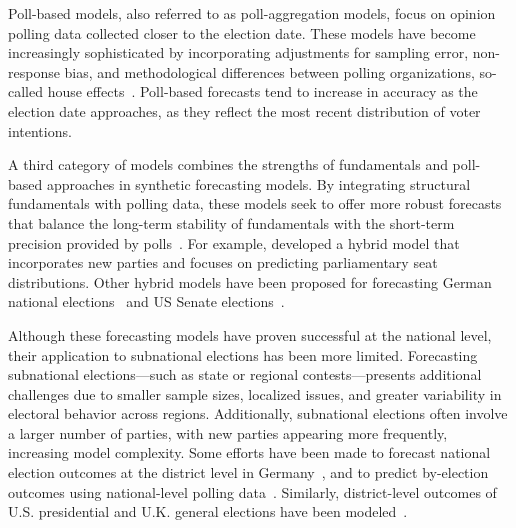 \documentclass[12pt]{article}
\begin{document}
\begin{doublespacing}
Poll-based models, also referred to as poll-aggregation models, focus on opinion polling data collected closer to the election date. These models have become increasingly sophisticated by incorporating adjustments for sampling error, non-response bias, and methodological differences between polling organizations, so-called house effects~\citep{shirani2018disentangling,jackman2005pooling}. Poll-based forecasts tend to increase in accuracy as the election date approaches, as they reflect the most recent distribution of voter intentions.

A third category of models combines the strengths of fundamentals and poll-based approaches in synthetic forecasting models\citep{Lewis-Beck_Nadeau_Belanger_2016, Lewis-Beck_Dassonneville_2015}. By integrating structural fundamentals with polling data, these models seek to offer more robust forecasts that balance the long-term stability of fundamentals with the short-term precision provided by polls~\citep{munzert_2017}. For example, \citet{MONTALVO201952} developed a hybrid model that incorporates new parties and focuses on predicting parliamentary seat distributions. Other hybrid models have been proposed for forecasting German national elections~\citep{Stoetzer_Neunhoeffer_Gschwend_Munzert_Sternberg_2019} and US Senate elections~\citep{Chen_Garnett_Montgomery_2023}.

Although these forecasting models have proven successful at the national level, their application to subnational elections has been more limited. Forecasting subnational elections—such as state or regional contests—presents additional challenges due to smaller sample sizes, localized issues, and greater variability in electoral behavior across regions. Additionally, subnational elections often involve a larger number of parties, with new parties appearing more frequently, increasing model complexity.  Some efforts have been made to forecast national election outcomes at the district level in Germany~\citep{munzert2017forecasting, neunhoeffer2020ansatz}, and to predict by-election outcomes using national-level polling data~\citep{hanretty2021forecasting}. Similarly, district-level outcomes of U.S. presidential and U.K. general elections have been modeled~\citep{LAUDERDALE2020399}. 


\end{doublespacing}
\end{document}
